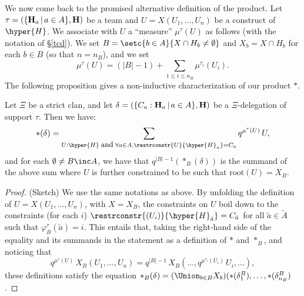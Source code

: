 We now come back to the promised alternative definition of the   product. 
Let $\tau=(\{{\bf H}_a\,|\,a\in A\},{\bf H})$ be a team and $U=X(U_1,\ldots,U_n)$ be a construct of $\hyper{H}$. We  associate with $U$ a ``measure''  $\mu^\tau(U)$ as follows (with the notation of \S\ref{tcd}).  We set $B=\setc{b\in A}{X\cap H_b\neq\emptyset}$ and $X_b=X\cap H_b$ for each $b\in B$ (so that $n=n_B$), and we set
$$\mu^\tau(U)=(|B|-1)+ \sum_{1\leq i\leq n_B}\mu^{\tau_i}(U_i).$$The following proposition gives a non-inductive characterization of our product $\ast$.
\begin{proposition} \label{restriction-product-characterization} Let $\Xi$ be a strict clan, and
let $\delta=(\{C_a:{\bf H}_a\,|\, a\in A\},{\bf H})$ be a $\Xi$-delegation of support $\tau$. Then we have:
$$\ast(\delta)= \sum_{U:\hyper{H} \;\mbox{{\small and}}\; \forall a\in A, \restrconstr{U}{\hyper{H}_a}=C_a} q^{\mu^\tau(U)}\, U,$$
and for each $\emptyset\neq B\inc A$, we have that $q^{|B|-1} (\ast_B(\delta))$ is the summand of the above sum where $U$  is further constrained to be such that $\mbox{root}(U)=X_B$.
\end{proposition}
\begin{proof} (Sketch) We use the same notations as above. By unfolding the definition of $U=X(U_1,\ldots,U_n)$, with $X=X_B$, the constraints on $U$ boil down to the constraints (for each $i$) $\restrconstr{(U_i)}{\hyper{H}_{\tilde{a}}}=C_{\tilde{a}}$  for all $\tilde{a}\in\tilde{A}$ such that
$\varphi^{\tau}_B(\tilde{a})=i$. This entails that, taking the right-hand side of the equality and its summands   in the statement as a definition of $\ast$ and $\ast_B$, and noticing that
\begin{equation*}
q^{\mu^\tau(U)}\, X_B(U_1,\ldots,U_n)= q^{|B|-1}\, X_B(\ldots,q^{\mu^{\tau_i}(U_i)}\, U_i,\ldots),
\end{equation*}
 these definitions satisfy the equation $\ast_B(\delta)=(\Union_{b\in B}X_b)(\ast(\delta^B_1),\dots,\ast(\delta^B_{n_{B}})$.
\end{proof}

